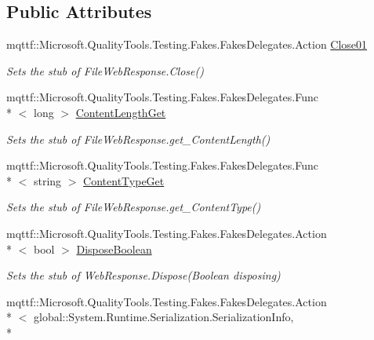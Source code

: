 \subsection*{Public Attributes}
\begin{DoxyCompactItemize}
\item 
mqttf\-::\-Microsoft.\-Quality\-Tools.\-Testing.\-Fakes.\-Fakes\-Delegates.\-Action \hyperlink{class_system_1_1_net_1_1_fakes_1_1_stub_file_web_response_a6ede8054938a782a6c29f1f1d3e97dc2}{Close01}
\begin{DoxyCompactList}\small\item\em Sets the stub of File\-Web\-Response.\-Close()\end{DoxyCompactList}\item 
mqttf\-::\-Microsoft.\-Quality\-Tools.\-Testing.\-Fakes.\-Fakes\-Delegates.\-Func\\*
$<$ long $>$ \hyperlink{class_system_1_1_net_1_1_fakes_1_1_stub_file_web_response_af491171aa4a586a60ef4c5d7b43ac580}{Content\-Length\-Get}
\begin{DoxyCompactList}\small\item\em Sets the stub of File\-Web\-Response.\-get\-\_\-\-Content\-Length()\end{DoxyCompactList}\item 
mqttf\-::\-Microsoft.\-Quality\-Tools.\-Testing.\-Fakes.\-Fakes\-Delegates.\-Func\\*
$<$ string $>$ \hyperlink{class_system_1_1_net_1_1_fakes_1_1_stub_file_web_response_a353cdade93ba77c2a3719107f3edb3a0}{Content\-Type\-Get}
\begin{DoxyCompactList}\small\item\em Sets the stub of File\-Web\-Response.\-get\-\_\-\-Content\-Type()\end{DoxyCompactList}\item 
mqttf\-::\-Microsoft.\-Quality\-Tools.\-Testing.\-Fakes.\-Fakes\-Delegates.\-Action\\*
$<$ bool $>$ \hyperlink{class_system_1_1_net_1_1_fakes_1_1_stub_file_web_response_a804db4f6d44e017527772a0fe561a3f1}{Dispose\-Boolean}
\begin{DoxyCompactList}\small\item\em Sets the stub of Web\-Response.\-Dispose(\-Boolean disposing)\end{DoxyCompactList}\item 
mqttf\-::\-Microsoft.\-Quality\-Tools.\-Testing.\-Fakes.\-Fakes\-Delegates.\-Action\\*
$<$ global\-::\-System.\-Runtime.\-Serialization.\-Serialization\-Info, \\*

\end{DoxyCompactItemize}
